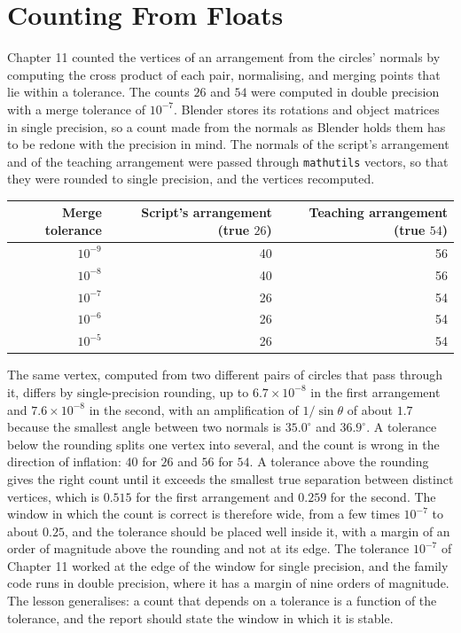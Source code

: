 \section{Counting From Floats}

Chapter 11 counted the vertices of an arrangement from the circles' normals by computing the cross product of each pair, normalising, and merging points that lie within a tolerance. The counts $26$ and $54$ were computed in double precision with a merge tolerance of $10^{-7}$. Blender stores its rotations and object matrices in single precision, so a count made from the normals as Blender holds them has to be redone with the precision in mind. The normals of the script's arrangement and of the teaching arrangement were passed through \texttt{mathutils} vectors, so that they were rounded to single precision, and the vertices recomputed.

\begin{center}
\begin{tabular}{rrr}
\toprule
Merge tolerance & Script's arrangement (true $26$) & Teaching arrangement (true $54$)\\
\midrule
$10^{-9}$ & 40 & 56\\
$10^{-8}$ & 40 & 56\\
$10^{-7}$ & 26 & 54\\
$10^{-6}$ & 26 & 54\\
$10^{-5}$ & 26 & 54\\
\bottomrule
\end{tabular}
\end{center}

The same vertex, computed from two different pairs of circles that pass through it, differs by single-precision rounding, up to $6.7\times10^{-8}$ in the first arrangement and $7.6\times10^{-8}$ in the second, with an amplification of $1/\sin\theta$ of about $1.7$ because the smallest angle between two normals is $35.0^\circ$ and $36.9^\circ$. A tolerance below the rounding splits one vertex into several, and the count is wrong in the direction of inflation: $40$ for $26$ and $56$ for $54$. A tolerance above the rounding gives the right count until it exceeds the smallest true separation between distinct vertices, which is $0.515$ for the first arrangement and $0.259$ for the second. The window in which the count is correct is therefore wide, from a few times $10^{-7}$ to about $0.25$, and the tolerance should be placed well inside it, with a margin of an order of magnitude above the rounding and not at its edge. The tolerance $10^{-7}$ of Chapter 11 worked at the edge of the window for single precision, and the family code runs in double precision, where it has a margin of nine orders of magnitude. The lesson generalises: a count that depends on a tolerance is a function of the tolerance, and the report should state the window in which it is stable.

